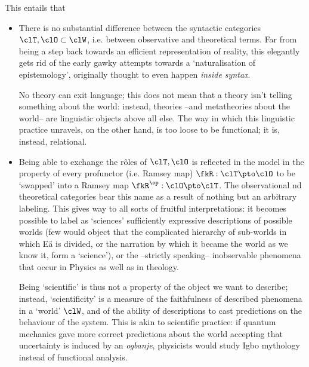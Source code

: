 This entails that
\begin{itemize}
    \item There is no substantial difference between the syntactic categories $\clT,\clO\subset \clW$, i.e. between observative and theoretical terms. Far from being a step back towards an efficient representation of reality, this elegantly gets rid of the early gawky attempts towards a `naturalisation of epistemology', originally thought to even happen \emph{inside syntax}. 
    
    No theory can exit language; this does not mean that a theory isn't telling something about the world: instead, theories --and metatheories about the world-- are linguistic objects above all else. The way in which this linguistic practice unravels, on the other hand, is too loose to be functional; it is, instead, relational.
    \item Being able to exchange the r\^oles of $\clT,\clO$ is reflected in the model in the property of every profunctor (i.e. Ramsey map) $\fkR : \clT \pto \clO$ to be `swapped' into a Ramsey map $\fkR^\op : \clO \pto \clT$. The observational nd theoretical categories bear this name as a result of nothing but an arbitrary labeling. This gives way to all sorts of fruitful interpretations: it becomes possible to label as `sciences' sufficiently expressive descriptions of possible worlds (few would object that the complicated hierarchy of sub-worlds in which Eä is divided, or the narration by which it became the world as we know it, form a `science'), or the --strictly speaking-- inobservable phenomena that occur in Physics as well as in theology. 
    
    Being `scientific' is thus not a property of the object we want to describe; instead, `scientificity' is a measure of the faithfulness of described phenomena in a `world' $\clW$, and of the ability of descriptions to cast predictions on the behaviour of the system. This is akin to scientific practice: if quantum mechanics gave more correct predictions about the world accepting that uncertainty is induced by an \emph{ogbanje}, physicists would study Igbo mythology instead of functional analysis.

\end{itemize}


